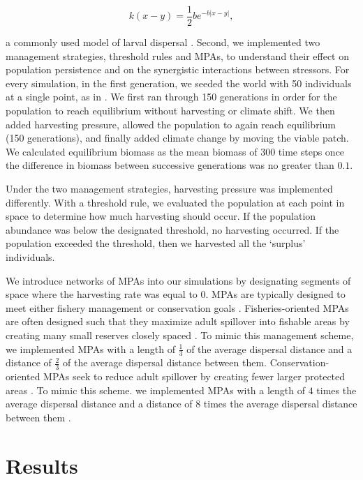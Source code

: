 \documentclass[12pt,english]{article}
\begin{document}
\begin{spacing}{1.9}
\begin{flushleft}
\[ k(x-y)=\frac{1}{2}be^{-b|x-y|},\]

\noindent a commonly used model of larval dispersal \citep{Pinsky:2011fk}.  Second, we implemented two management strategies, threshold rules and MPAs, to understand their effect on population persistence and on the synergistic interactions between stressors.  For every simulation, in the first generation, we seeded the world with 50 individuals at a single point, as in \cite{ZhouKot2011}. We first ran through 150 generations in order for the population to reach equilibrium without harvesting or climate shift.  We then added harvesting pressure, allowed the population to again reach equilibrium (150 generations), and finally added climate change by moving the viable patch.  We calculated equilibrium biomass as the mean biomass of 300 time steps once the difference in biomass between successive generations was no greater than $0.1$.  

Under the two management strategies, harvesting pressure was implemented differently.  With a threshold rule, we evaluated the population at each point in space to determine how much harvesting should occur. If the population abundance was below the designated threshold, no harvesting occurred. If the population exceeded the threshold, then we harvested all the `surplus' individuals.

We introduce networks of MPAs into our simulations by designating segments of space where the harvesting rate was equal to $0$.  MPAs are typically designed to meet either fishery management  or conservation goals \citep{Agardy1994, HollandBrazee1996, Gainesetal2010a}.  Fisheries-oriented MPAs are often designed such that they maximize adult spillover into fishable areas by creating many small reserves closely spaced \citep{HastingsBotsford2003,Gaylordetal2005, Gainesetal2010a}. To mimic this management scheme, we implemented MPAs with a length of $\tfrac{1}{3}$ of the average dispersal distance and a distance of $\tfrac{2}{3}$ of the average dispersal distance between them.   Conservation-oriented MPAs seek to reduce adult spillover by creating fewer larger protected areas \citep{HastingsBotsford2006, Gainesetal2010a}.  To mimic this scheme. we implemented MPAs with a length of $4$ times the average dispersal distance and a distance of $8$ times the average dispersal distance between them \citep{Lockwoodetal2002}. 

\section{Results}


\end{flushleft}
\end{spacing}
\end{document}

